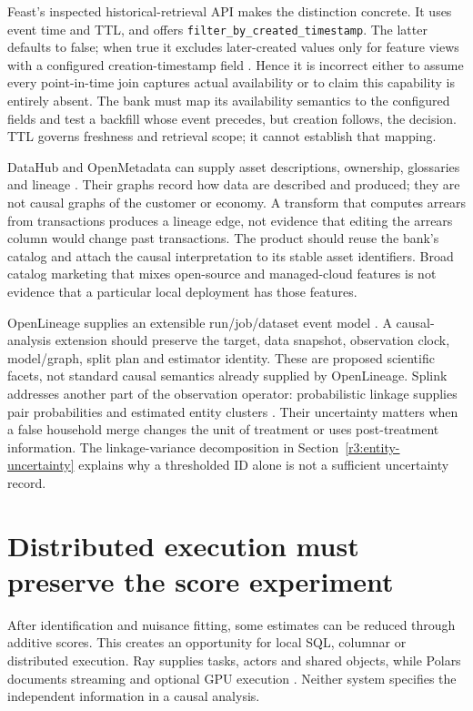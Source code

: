 Feast's inspected historical-retrieval API makes the distinction concrete.
It uses event time and TTL, and offers
\texttt{filter\_by\_created\_timestamp}. The latter defaults to false;
when true it excludes later-created values only for feature views with
a configured creation-timestamp field \citep{sw_feast}. Hence it is
incorrect either to assume every point-in-time join captures actual
availability or to claim this capability is entirely absent. The bank
must map its availability semantics to the configured fields and test a
backfill whose event precedes, but creation follows, the decision.
TTL governs freshness and retrieval scope; it cannot establish that mapping.

DataHub and OpenMetadata can supply asset descriptions, ownership,
glossaries and lineage \citep{sw_datahub,sw_openmetadata}. Their graphs
record how data are described and produced; they are not causal graphs
of the customer or economy. A transform that computes arrears from
transactions produces a lineage edge, not evidence that editing the
arrears column would change past transactions. The product should reuse
the bank's catalog and attach the causal interpretation to its stable
asset identifiers. Broad catalog marketing that mixes open-source and
managed-cloud features is not evidence that a particular local deployment
has those features.

OpenLineage supplies an extensible run/job/dataset event model
\citep{sw_openlineage}. A causal-analysis extension should preserve the
target, data snapshot, observation clock, model/graph, split plan and
estimator identity. These are proposed scientific facets, not standard
causal semantics already supplied by OpenLineage. Splink addresses another
part of the observation operator: probabilistic linkage supplies pair
probabilities and estimated entity clusters \citep{sw_splink}. Their
uncertainty matters when a false household merge changes the unit of
treatment or uses post-treatment information. The linkage-variance
decomposition in Section~\ref{r3:entity-uncertainty} explains why a
thresholded ID alone is not a sufficient uncertainty record.

\section{Distributed execution must preserve the score experiment}
\label{r3:software-execution}

After identification and nuisance fitting, some estimates can be reduced
through additive scores. This creates an opportunity for local SQL,
columnar or distributed execution. Ray supplies tasks, actors and shared
objects, while Polars documents streaming and optional GPU execution
\citep{sw_ray,sw_polars}. Neither system specifies the independent
information in a causal analysis.

